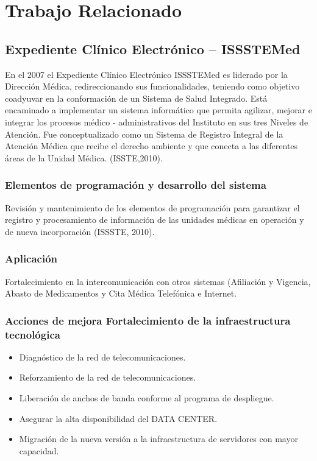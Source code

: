 \chapter{Trabajo Relacionado}

\section{Expediente Clínico Electrónico – ISSSTEMed}

En el 2007 el Expediente Clínico Electrónico ISSSTEMed es liderado por la Dirección Médica, redireccionando sus funcionalidades, teniendo como objetivo coadyuvar en la conformación de un Sistema de Salud Integrado. Está encaminado a implementar un sistema informático que permita agilizar, mejorar e integrar los procesos médico - administrativos del Instituto en sus tres Niveles de Atención. Fue conceptualizado como un Sistema de Registro Integral de la Atención Médica que recibe el derecho ambiente y que conecta a las diferentes áreas de la Unidad Médica. (ISSTE,2010).

\subsection{Elementos de programación y desarrollo del sistema}
 Revisión y mantenimiento de los elementos de programación para garantizar el registro y procesamiento de información de las unidades médicas en operación y de nueva incorporación (ISSSTE, 2010).

\subsection{Aplicación}
 Fortalecimiento en la intercomunicación con otros sistemas (Afiliación y Vigencia, Abasto de Medicamentos y Cita Médica Telefónica e Internet.

\subsection{Acciones de mejora Fortalecimiento de la infraestructura tecnológica }
\begin{itemize}
  \item Diagnóstico de la red de telecomunicaciones.
  \item Reforzamiento de la red de telecomunicaciones.
  \item Liberación de anchos de banda conforme al programa de despliegue.
  \item Asegurar la alta disponibilidad del DATA CENTER.
  \item Migración de la nueva versión a la infraestructura de servidores con mayor capacidad.


\end{itemize}

